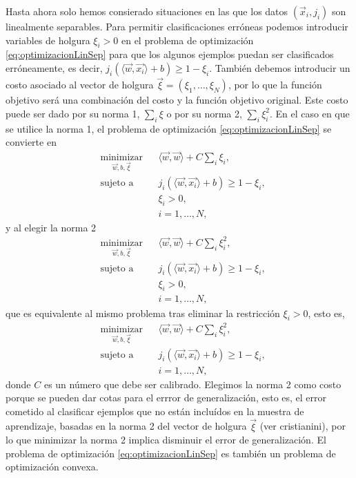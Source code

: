 \documentclass[letterpaper,12pt]{book}
\begin{document}
Hasta ahora solo hemos consierado situaciones en las que los datos $(\vec{x}_i,j_i)$ son linealmente separables. Para permitir clasificaciones erróneas podemos introducir variables de holgura $\xi_i>0$ en el problema de optimización \ref{eq:optimizacionLinSep} para que los algunos ejemplos puedan ser clasificados erróneamente, es decir,  $j_i(\langle \vec{w}, \vec{x_i}\rangle + b)\geq 1-\xi_i$. También debemos introducir un costo asociado al vector de holgura $\vec{\xi}=(\xi_1,\dots,\xi_N)$, por lo que la función objetivo será una combinación del costo y la función objetivo original. Este costo puede ser dado por su norma 1, $\sum_i\xi$ o por su norma 2, $\sum_i\xi_i^2$. En el caso en que se utilice la norma 1, el problema de optimización \ref{eq:optimizacionLinSep} se convierte en 
\begin{equation}
  \begin{aligned}
    & \underset{\vec{w},b, \vec{\xi}}{\text{minimizar}}
    & & \langle \vec{w}, \vec{w} \rangle +C\sum_i\xi_i,\\
    & \text{sujeto a}
    & & j_i(\langle \vec{w}, \vec{x_i}\rangle + b)\geq 1-\xi_i, \\
    & & & \xi_i>0, \\
    & & & i = 1, \ldots, N,
  \end{aligned}
\end{equation}
y al elegir la norma 2
\begin{equation}
  \begin{aligned}
    & \underset{\vec{w},b, \vec{\xi}}{\text{minimizar}}
    & & \langle \vec{w}, \vec{w} \rangle +C\sum_i\xi_i^2,\\
    & \text{sujeto a}
    & & j_i(\langle \vec{w}, \vec{x_i}\rangle + b)\geq 1-\xi_i, \\
    & & & \xi_i>0, \\
    & & & i = 1, \ldots, N,
  \end{aligned}
\end{equation}
que es equivalente al mismo problema tras eliminar la restricción $\xi_i>0$, esto es,
\begin{equation}\label{eq:problemaOptimizacionPrimalMSV}
  \begin{aligned}
    & \underset{\vec{w},b, \vec{\xi}}{\text{minimizar}}
    & & \langle \vec{w}, \vec{w} \rangle +C\sum_i\xi_i^2,\\
    & \text{sujeto a}
    & & j_i(\langle \vec{w}, \vec{x_i}\rangle + b)\geq 1-\xi_i, \\
    & & & i = 1, \ldots, N,
  \end{aligned}
\end{equation}
donde $C$ es un número que debe ser calibrado. Elegimos la norma 2 como costo porque se pueden dar cotas para el errror de generalización, esto es, el error cometido al clasificar ejemplos que no están incluídos en la muestra de aprendizaje, basadas en la norma 2 del vector de holgura $\vec{\xi}$ (ver cristianini), por lo que minimizar la norma 2 implica disminuir el error de generalización. El problema de optimización \ref{eq:optimizacionLinSep} es también un problema de optimización convexa.
\end{document}

